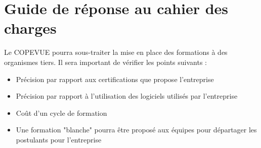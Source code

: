 \section{Guide de réponse au cahier des charges}

Le COPEVUE pourra sous-traiter la mise en place des formations à des organismes 
tiers. Il sera important de vérifier les points suivants : \\

\begin{itemize}
\item Précision par rapport aux certifications que propose l'entreprise
\item Précision par rapport à l'utilisation des logiciels utilisés par l'entreprise
\item Coût d'un cycle de formation
\item Une formation "blanche" pourra être proposé aux équipes pour départager les
postulants pour l'entreprise
\end{itemize}

